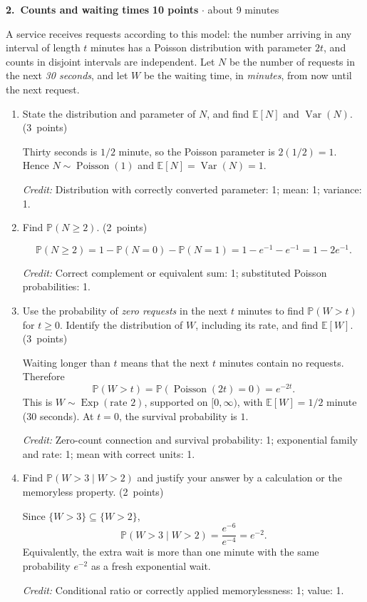 \documentclass[11pt,letterpaper]{article}
\newcommand{\Prob}{\mathbb P}
\newcommand{\E}{\mathbb E}
\DeclareMathOperator{\Var}{Var}
\newcommand{\partpts}[1]{\unskip\nobreak\hspace{.3em}%
  \mbox{\small\color{muted}(#1 points)}}
\newcommand{\credit}[1]{\par{\footnotesize\color{muted}\textit{Credit:} #1}}
\newcommand{\problem}[4]{\par\addvspace{8pt}%
  {\large\bfseries\color{indigo}#1.\ #2}\hfill
  {\small\color{muted}\textbf{#3 points} $\cdot$ about #4 minutes}\par\nobreak}
\begin{document}
\newpage
\problem{2}{Counts and waiting times}{10}{9}
A service receives requests according to this model: the number arriving
in any interval of length $t$ minutes has a Poisson distribution with
parameter $2t$, and counts in disjoint intervals are independent.
Let $N$ be the number of requests in the next \emph{30 seconds}, and let
$W$ be the waiting time, in \emph{minutes}, from now until the next request.
\begin{enumerate}
  \item State the distribution and parameter of $N$, and find
  $\E[N]$ and $\Var(N)$. \partpts{3}
  \begin{solution}[1.15in]
    Thirty seconds is $1/2$ minute, so the Poisson parameter is
    $2(1/2)=1$. Hence $N\sim\operatorname{Poisson}(1)$ and
    $\E[N]=\Var(N)=1$.
    \credit{Distribution with correctly converted parameter: 1;
    mean: 1; variance: 1.}
  \end{solution}

  \item Find $\Prob(N\ge2)$. \partpts{2}
  \begin{solution}[1.15in]
    \[
      \Prob(N\ge2)=1-\Prob(N=0)-\Prob(N=1)
        =1-e^{-1}-e^{-1}=1-2e^{-1}.
    \]
    \credit{Correct complement or equivalent sum: 1;
    substituted Poisson probabilities: 1.}
  \end{solution}

  \item Use the probability of \emph{zero requests} in the next $t$
  minutes to find $\Prob(W>t)$ for $t\ge0$. Identify the distribution
  of $W$, including its rate, and find $\E[W]$. \partpts{3}
  \begin{solution}[1.6in]
    Waiting longer than $t$ means that the next $t$ minutes contain
    no requests. Therefore
    \[
      \Prob(W>t)=\Prob(\operatorname{Poisson}(2t)=0)=e^{-2t}.
    \]
    This is $W\sim\operatorname{Exp}(\text{rate }2)$, supported on
    $[0,\infty)$, with $\E[W]=1/2$ minute (30 seconds).
    At $t=0$, the survival probability is $1$.
    \credit{Zero-count connection and survival probability: 1;
    exponential family and rate: 1; mean with correct units: 1.}
  \end{solution}

  \item Find $\Prob(W>3\mid W>2)$ and justify your answer by a
  calculation or the memoryless property. \partpts{2}
  \begin{solution}[1.3in]
    Since $\{W>3\}\subseteq\{W>2\}$,
    \[
      \Prob(W>3\mid W>2)=\frac{e^{-6}}{e^{-4}}=e^{-2}.
    \]
    Equivalently, the extra wait is more than one minute with the
    same probability $e^{-2}$ as a fresh exponential wait.
    \credit{Conditional ratio or correctly applied memorylessness: 1;
    value: 1.}
  \end{solution}
\end{enumerate}
\end{document}
